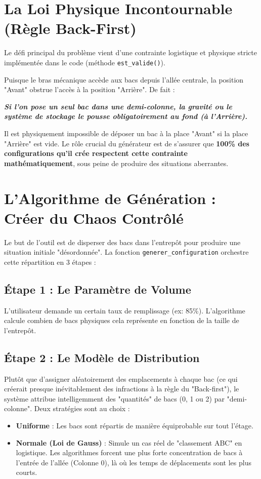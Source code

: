 \documentclass[12pt,a4paper]{article}
\begin{document}
\section{La Loi Physique Incontournable (Règle Back-First)}
Le défi principal du problème vient d'une contrainte logistique et physique stricte implémentée dans le code (méthode \texttt{est\_valide()}).

Puisque le bras mécanique accède aux bacs depuis l'allée centrale, la position "Avant" obstrue l'accès à la position "Arrière". De fait :
\begin{center}
    \textit{\textbf{Si l'on pose un seul bac dans une demi-colonne, la gravité ou le système de stockage le pousse obligatoirement au fond (à l'Arrière).}}
\end{center}

Il est physiquement impossible de déposer un bac à la place "Avant" si la place "Arrière" est vide. Le rôle crucial du générateur est de s'assurer que \textbf{100\% des configurations qu'il crée respectent cette contrainte mathématiquement}, sous peine de produire des situations aberrantes.

\section{L'Algorithme de Génération : Créer du Chaos Contrôlé}
Le but de l'outil est de disperser des bacs dans l'entrepôt pour produire une situation initiale "désordonnée". La fonction \texttt{generer\_configuration} orchestre cette répartition en 3 étapes :

\subsection{Étape 1 : Le Paramètre de Volume}
L'utilisateur demande un certain taux de remplissage (ex: 85\%). L'algorithme calcule combien de bacs physiques cela représente en fonction de la taille de l'entrepôt.

\subsection{Étape 2 : Le Modèle de Distribution}
Plutôt que d'assigner aléatoirement des emplacements à chaque bac (ce qui créerait presque inévitablement des infractions à la règle du "Back-first"), le système attribue intelligemment des "quantités" de bacs (0, 1 ou 2) par "demi-colonne". Deux stratégies sont au choix :
\begin{itemize}
    \item \textbf{Uniforme} : Les bacs sont répartis de manière équiprobable sur tout l'étage.
    \item \textbf{Normale (Loi de Gauss)} : Simule un cas réel de "classement ABC" en logistique. Les algorithmes forcent une plus forte concentration de bacs à l'entrée de l'allée (Colonne 0), là où les temps de déplacements sont les plus courts.
\end{itemize}
\end{document}
